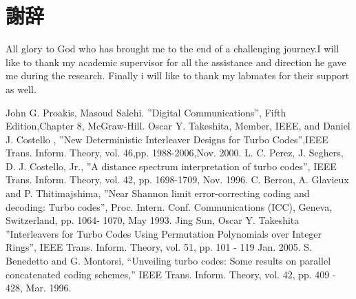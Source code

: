 \documentclass[a4paper, 12pt, oneside, openary]{jbook}
\begin{document}
\chapter*{謝辞}
All glory to God who has brought me to the end of a challenging journey.I will like to thank my academic supervisor for all the assistance and direction he gave me during the research. Finally i will like to thank my labmates for their support as well.
\renewcommand{\bibname}{参考文献}
\begin{thebibliography}{9}
John G. Proakis, Masoud Salehi. ''Digital Communications'', 
Fifth Edition,Chapter 8, McGraw-Hill.
Oscar Y. Takeshita, Member, IEEE, and Daniel J. Costello ,
''New Deterministic Interleaver Designs for Turbo Codes'',IEEE Trans. Inform. 
Theory, vol.  46,pp. 1988-2006,Nov. 2000.
 L. C. Perez, J. Seghers, D. J. Costello, Jr.,
 ''A distance spectrum interpretation of turbo codes'', IEEE Trans. Inform. Theory, 
 vol. 42, pp. 1698-1709, Nov. 1996.
C. Berrou, A. Glavieux and P. Thitimajshima, 
''Near Shannon limit error-correcting coding and
decoding: Turbo codes'', Proc. Intern. Conf. Communications (ICC), Geneva, 
Switzerland, pp. 1064-
1070, May 1993.
 Jing Sun, Oscar Y. Takeshita ''Interleavers for Turbo Codes Using 
Permutation Polynomials over Integer Rings'', IEEE Trans. Inform. Theory, vol. 51, 
pp. 101 - 119  Jan. 2005.
 S. Benedetto and G. Montorsi, “Unveiling turbo codes: Some results
on parallel concatenated coding schemes,” IEEE Trans. Inform. Theory,
vol. 42, pp. 409 - 428, Mar. 1996.
\end{thebibliography}
\end{document}
